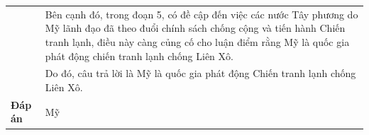 \begin{table}[ht]
{{\begin{tabular}{|p{3cm}|p{10cm}|}
                                     & Bên cạnh đó, trong đoạn 5, có đề cập đến việc các nước Tây phương do Mỹ lãnh đạo đã theo đuổi chính sách chống cộng và tiến hành Chiến tranh lạnh, điều này càng củng cố cho luận điểm rằng Mỹ là quốc gia phát động chiến tranh lạnh chống Liên Xô.                                                                                                                                                                                                                                                                                                                                         \\


                                     & Do đó, câu trả lời là Mỹ là quốc gia phát động Chiến tranh lạnh chống Liên Xô.                                                                                                                                                                                                                                                                                                                                                                                                                                                                                                               \\
                \hline
                \textbf{Đáp án}      & Mỹ                                                                                                                                                                                                                                                                                                                                                                                                                                                                                                                                                                                           \\
                \hline
            \end{tabular}
        }
    }
    \label{tab:open_question}
\end{table}
